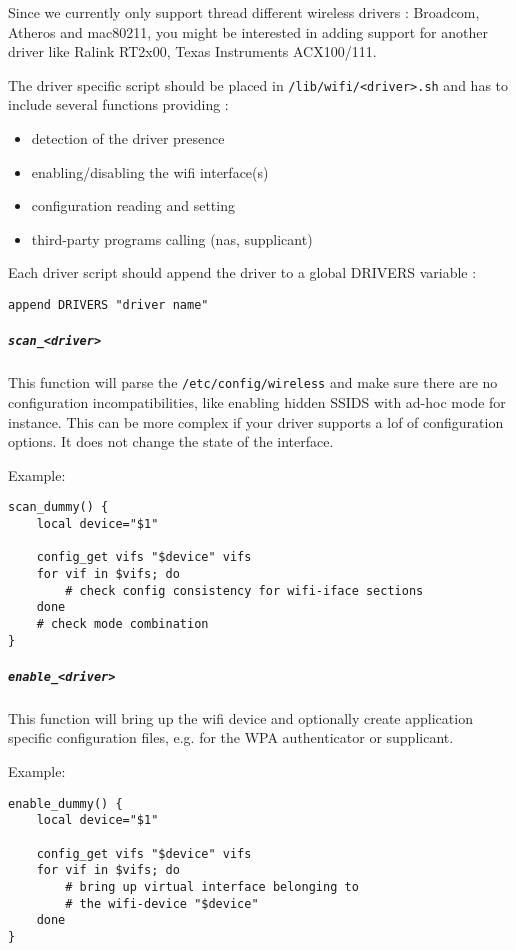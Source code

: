 Since we currently only support thread different wireless drivers : Broadcom, Atheros and mac80211,
you might be interested in adding support for another driver like Ralink RT2x00, 
Texas Instruments ACX100/111.

The driver specific script should be placed in \texttt{/lib/wifi/<driver>.sh} and has to
include several functions providing :

\begin{itemize}
	\item detection of the driver presence
	\item enabling/disabling the wifi interface(s)
	\item configuration reading and setting
	\item third-party programs calling (nas, supplicant)
\end{itemize}

Each driver script should append the driver to a global DRIVERS variable :

\begin{Verbatim}
append DRIVERS "driver name"
\end{Verbatim}

\subparagraph{\texttt{scan\_<driver>}}

This function will parse the \texttt{/etc/config/wireless} and make sure there
are no configuration incompatibilities, like enabling hidden SSIDS with ad-hoc mode
for instance. This can be more complex if your driver supports a lof of configuration
options. It does not change the state of the interface.

Example:
\begin{Verbatim}
scan_dummy() {
	local device="$1"

	config_get vifs "$device" vifs
	for vif in $vifs; do
		# check config consistency for wifi-iface sections
	done
	# check mode combination
}
\end{Verbatim}

\subparagraph{\texttt{enable\_<driver>}}

This function will bring up the wifi device and optionally create application specific
configuration files, e.g. for the WPA authenticator or supplicant.

Example:
\begin{Verbatim}
enable_dummy() {
	local device="$1"

	config_get vifs "$device" vifs
	for vif in $vifs; do
		# bring up virtual interface belonging to
		# the wifi-device "$device"
	done
}
\end{Verbatim}

